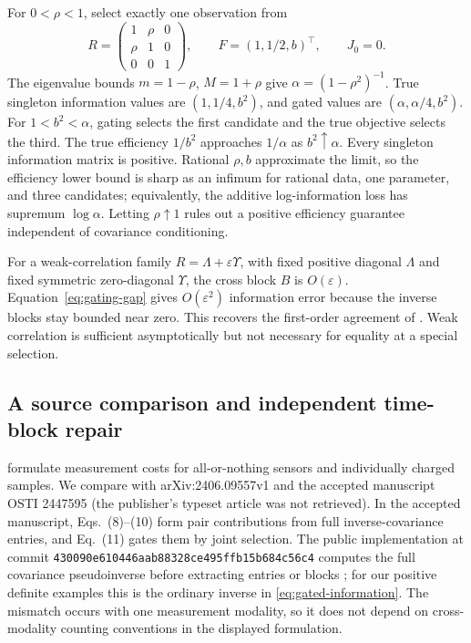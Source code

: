 \begin{example}[Sharpness]
\label{ex:gated-sharpness}
For $0<\rho<1$, select exactly one observation from
\[
 R=\begin{pmatrix}1&\rho&0\\\rho&1&0\\0&0&1\end{pmatrix},\qquad
 F=(1,1/2,b)^\top,\qquad J_0=0.
\]
The eigenvalue bounds $m=1-\rho$, $M=1+\rho$ give
$\alpha=(1-\rho^2)^{-1}$. True singleton information values are
$(1,1/4,b^2)$, and gated values are $(\alpha,\alpha/4,b^2)$.
For $1<b^2<\alpha$, gating selects the first candidate and the true objective
selects the third. The true efficiency $1/b^2$ approaches $1/\alpha$ as
$b^2\uparrow\alpha$. Every singleton information matrix is positive.
Rational $\rho,b$ approximate the limit, so the efficiency lower bound is
sharp as an infimum for rational data, one parameter, and three candidates;
equivalently, the additive log-information loss has supremum $\log\alpha$.
Letting $\rho\uparrow1$ rules out a positive efficiency guarantee independent of
covariance conditioning.
\end{example}
For a weak-correlation family $R=\Lambda+\varepsilon\Upsilon$, with fixed
positive diagonal $\Lambda$ and fixed symmetric zero-diagonal $\Upsilon$,
the cross block $B$ is $O(\varepsilon)$. Equation~\eqref{eq:gating-gap}
gives $O(\varepsilon^2)$ information error because the inverse blocks stay
bounded near zero. This recovers the first-order agreement of
\citet[Proposition~2]{Liu2016}. Weak correlation is sufficient
asymptotically but not necessary for equality at a special selection.

\subsection{A source comparison and independent time-block repair}
\label{subsec:source-comparison}
\citet{Wang2024} formulate measurement costs for all-or-nothing sensors and
individually charged samples. We compare with arXiv:2406.09557v1 and the
accepted manuscript OSTI 2447595 (the publisher's typeset article was not
retrieved). In the accepted manuscript, Eqs.~(8)--(10) form pair
contributions from full inverse-covariance entries, and Eq.~(11) gates them
by joint selection. The public implementation at commit
\texttt{430090e610446aab88328ce495ffb15b684c56c4} computes the full
covariance pseudoinverse before extracting entries or blocks
\citep{MeasurementOpt2025}; for our positive definite examples this is the
ordinary inverse in \eqref{eq:gated-information}. The mismatch occurs with
one measurement modality, so it does not depend on cross-modality counting
conventions in the displayed formulation.


